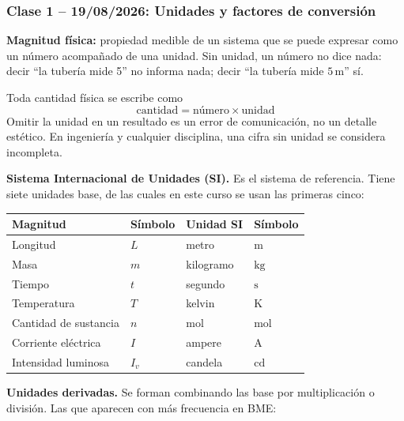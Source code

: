 
{}
\subsubsection*{\textcolor{blueunam}{Clase 1 -- 19/08/2026: Unidades y factores de conversión}}

\textbf{Magnitud física:} propiedad medible de un sistema que se puede
expresar como un número acompañado de una unidad. Sin unidad, un número
no dice nada: decir ``la tubería mide 5'' no informa nada; decir
``la tubería mide $5\,\mathrm{m}$'' sí.

Toda cantidad física se escribe como
\[
\text{cantidad} = \text{número} \times \text{unidad}
\]
Omitir la unidad en un resultado es un error de comunicación, no un
detalle estético. En ingeniería y cualquier disciplina, una cifra sin unidad se considera
incompleta.

\textbf{Sistema Internacional de Unidades (SI).} Es el sistema de
referencia. Tiene siete unidades base, de las cuales en este curso se
usan las primeras cinco:

\begin{center}
\renewcommand{\arraystretch}{1.4}
\begin{tabular}{|L{3cm}|L{2.5cm}|L{3cm}|L{4cm}|}
\hline
\textbf{Magnitud} & \textbf{Símbolo} & \textbf{Unidad SI} & \textbf{Símbolo} \\
\hline
Longitud & $L$ & metro & $\mathrm{m}$ \\
\hline
Masa & $m$ & kilogramo & $\mathrm{kg}$ \\
\hline
Tiempo & $t$ & segundo & $\mathrm{s}$ \\
\hline
Temperatura & $T$ & kelvin & $\mathrm{K}$ \\
\hline
Cantidad de sustancia & $n$ & mol & $\mathrm{mol}$ \\
\hline
Corriente eléctrica & $I$ & ampere & $\mathrm{A}$ \\
\hline
Intensidad luminosa & $I_v$ & candela & $\mathrm{cd}$ \\
\hline
\end{tabular}
\end{center}

\textbf{Unidades derivadas.} Se forman combinando las base por
multiplicación o división. Las que aparecen con más frecuencia en BME:

